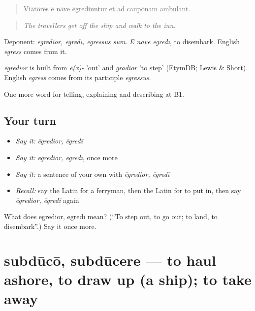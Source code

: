 \begin{quote}
Viātōrēs ē nāve ēgrediuntur et ad caupōnam ambulant.
\end{quote}

\begin{quote}
\emph{The travellers get off the ship and walk to the inn.}
\end{quote}

Deponent: \emph{ēgredior, ēgredī, ēgressus sum}. \emph{Ē nāve ēgredī}, to disembark. English \emph{egress} comes from it.

\begin{cousinweb}
\emph{ēgredior} is built from \emph{ē(x)-} 'out' and \emph{gradior} 'to step' (EtymDB; Lewis \& Short). English \emph{egress} comes from its participle \emph{ēgressus}.
\end{cousinweb}

\begin{grammarlens}[title={What you've built}]
One more word for telling, explaining and describing at B1.
\end{grammarlens}

\subsection*{Your turn}
\begin{itemize}
\raggedright
  \item \emph{Say it:} \emph{ēgredior, ēgredī}
  \item \emph{Say it:} \emph{ēgredior, ēgredī}, once more
  \item \emph{Say it:} a sentence of your own with \emph{ēgredior, ēgredī}
  \item \emph{Recall:} say the Latin for a ferryman, then the Latin for to put in, then say \emph{ēgredior, ēgredī} again
\end{itemize}

\begin{tcolorbox}[breakable,colback=teal!4,colframe=teal!35!black,title={Before you move on}]
What does ēgredior, ēgredī mean? (\textquotedblleft{}To step out, to go out; to land, to disembark\textquotedblright{}.) Say it once more.
\end{tcolorbox}
\section[subdūcō, subdūcere]{subdūcō, subdūcere — to haul ashore, to draw up (a ship); to take away}

\label{lesson:LA-C439-subduco}



